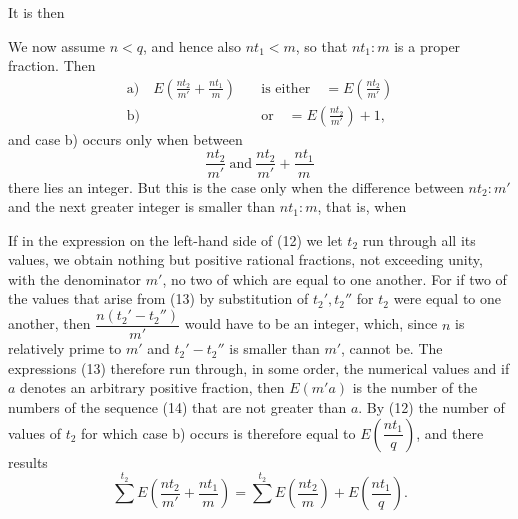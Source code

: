 It is then

We now assume $n < q$, and hence also $n t_1 < m$, so that
$n t_1 : m$ is a proper fraction. Then
\[
\begin{aligned}
\text{a)} \quad E\left(\frac{n t_2}{m'} + \frac{n t_1}{m}\right)
  &\quad \text{is either}\quad = E\left(\frac{n t_2}{m'}\right) \\
\text{b)} \quad
  &\quad \text{or}\quad = E\left(\frac{n t_2}{m'}\right) + 1,
\end{aligned}
\]
and case b) occurs only when between
\[
\frac{n t_2}{m'}\ \text{and}\ \frac{n t_2}{m'} + \frac{n t_1}{m}
\]
there lies an integer. But this is the case only when
the difference between $n t_2 : m'$ and the next greater
integer is smaller than $n t_1 : m$, that is, when

If in the expression on the left-hand side of (12)
we let $t_2$ run through all its values, we obtain nothing but positive
rational fractions, not exceeding unity, with the
denominator $m'$, no two of which are equal to one another. For if
two of the values that arise from (13) by substitution of
$t_2', t_2''$ for $t_2$ were equal to one another, then $\dfrac{n(t_2' - t_2'')}{m'}$ would have to be an
integer, which, since $n$ is relatively prime to $m'$ and $t_2' - t_2''$ is smaller
than $m'$, cannot be. The expressions (13) therefore run through,
in some order, the numerical values
and if $a$ denotes an arbitrary positive fraction, then
$E(m' a)$ is the number of the numbers of the sequence (14) that are not greater
than $a$. By (12) the number of values of $t_2$ for
which case b) occurs is therefore equal to $E\left(\dfrac{n t_1}{q}\right)$, and there results
\[
\sum^{t_2} E\left(\frac{n t_2}{m'} + \frac{n t_1}{m}\right) = \sum^{t_2} E\left(\frac{n t_2}{m}\right) + E\left(\frac{n t_1}{q}\right). %
\]
